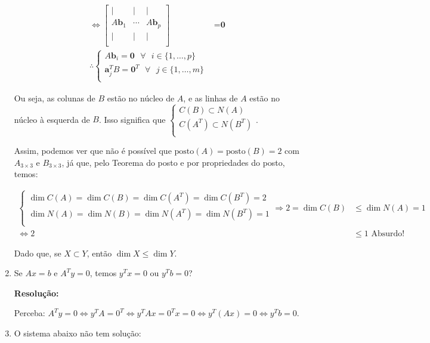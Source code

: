 \documentclass[leqno]{article}
\newcommand{\pst}[1]{\text{posto}(#1)}
\begin{document}
\begin{enumerate}
\begin{align*}
        \iff \begin{bmatrix}
            \vert & \vert & \vert\\
            A\textbf{b}_1 & \cdots & A\textbf{b}_p\\
            \vert & \vert & \vert\\
        \end{bmatrix}&=\textbf{0}\\
        \therefore \begin{cases}
            A\textbf{b}_i=\textbf{0}\text{ }\forall\text{ }i\in\{1,\dots,p\}\\
            \textbf{a}_j^TB=\textbf{0}^T\text{ }\forall\text{ }j\in\{1,\dots,m\}\\
        \end{cases}
    \end{align*}

    Ou seja, as colunas de $B$ estão no núcleo de $A$, e as linhas de $A$ estão no núcleo à esquerda de $B$. Isso significa que $\begin{cases}
        C(B)\subset N(A)\\
        C(A^T)\subset N(B^T)\\
    \end{cases}$.

    Assim, podemos ver que não é possível que $\pst{A}=\pst{B}=2$ com $A_{3\times3}$ e $B_{3\times3}$, já que, pelo Teorema do posto e por propriedades do posto, temos:

    \begin{align*}
        \begin{cases}
            \dim{C(A)}=\dim{C(B)}=\dim{C(A^T)}=\dim{C(B^T)}=2\\
            \dim{N(A)}=\dim{N(B)}=\dim{N(A^T)}=\dim{N(B^T)}=1\\
        \end{cases}\Rightarrow2=\dim{C(B)}&\leq\dim{N(A)}=1\\\iff 2&\leq1 \text{ Absurdo!}
    \end{align*}

    Dado que, se $X\subset Y$, então $\dim{X}\leq\dim{Y}$.
    
    \item Se $Ax=b$ e $A^Ty=0$, temos $y^Tx=0$ ou $y^Tb=0$?
    
    \textbf{Resolução:}

    Perceba: $A^Ty=0\iff y^TA=0^T\iff y^TAx=0^Tx=0\iff y^T(Ax)=0\iff y^Tb=0$.
    
    \item O sistema abaixo não tem solução:
    

\end{enumerate}
\end{document}

